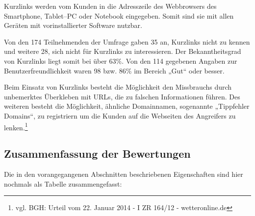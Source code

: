 Kurzlinks werden vom Kunden in die Adresszeile des Webbrowsers des Smartphone, Tablet–PC oder Notebook eingegeben. Somit sind sie mit allen Geräten mit vorinstallierter Software nutzbar. 

Von den 174 Teilnehmenden der Umfrage gaben 35 an, Kurzlinks nicht zu kennen und weitere 28, sich nicht für Kurzlinks zu interessieren. Der Bekanntheitsgrad von Kurzlinks liegt somit bei über 63\%. Von den 114 gegebenen Angaben zur Benutzerfreundlichkeit waren 98 bzw. 86\% im Bereich „Gut“ oder besser. 

Beim Einsatz von Kurzlinks besteht die Möglichkeit den Missbrauchs durch unbemerktes Überkleben mit \ac{URL}s, die zu falschen Informationen führen. Des weiteren besteht die Möglichkeit, ähnliche Domainnamen, sogenannte „Tippfehler Domains“, zu registriern um die Kunden auf die Webseiten des Angreifers zu lenken.\footnote{vgl. BGH: Urteil vom 22. Januar 2014 - I ZR 164/12 - wetteronline.de}

\subsection{Zusammenfassung der Bewertungen} %
\label{sub:zusammenfassung_der_bewertungen}

Die in den vorangegangenen Abschnitten beschriebenen Eigenschaften sind hier nochmals als Tabelle zusammengefasst:

